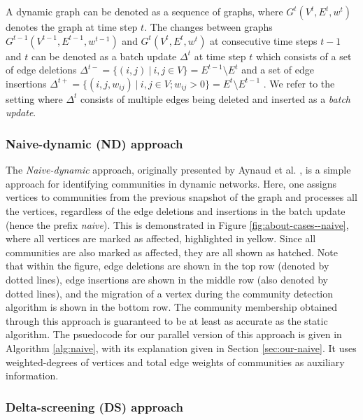 A dynamic graph can be denoted as a sequence of graphs, where $G^t(V^t, E^t, w^t)$ denotes the graph at time step $t$. The changes between graphs $G^{t-1}(V^{t-1}, E^{t-1}, w^{t-1})$ and $G^t(V^t, E^t, w^t)$ at consecutive time steps $t-1$ and $t$ can be denoted as a batch update $\Delta^t$ at time step $t$ which consists of a set of edge deletions $\Delta^{t-} = \{(i, j)\ |\ i, j \in V\} = E^{t-1} \setminus E^t$ and a set of edge insertions $\Delta^{t+} = \{(i, j, w_{ij})\ |\ i, j \in V; w_{ij} > 0\} = E^t \setminus E^{t-1}$ \cite{com-zarayeneh21}. We refer to the setting where $\Delta^t$ consists of multiple edges being deleted and inserted as a \textit{batch update}.


\subsubsection{Naive-dynamic (ND) approach}
\label{sec:naive-dynamic}

The \textit{Naive-dynamic} approach, originally presented by Aynaud et al. \cite{com-aynaud10}, is a simple approach for identifying communities in dynamic networks. Here, one assigns vertices to communities from the previous snapshot of the graph and processes all the vertices, regardless of the edge deletions and insertions in the batch update (hence the prefix \textit{naive}). This is demonstrated in Figure \ref{fig:about-cases--naive}, where all vertices are marked as affected, highlighted in yellow. Since all communities are also marked as affected, they are all shown as hatched. Note that within the figure, edge deletions are shown in the top row (denoted by dotted lines), edge insertions are shown in the middle row (also denoted by dotted lines), and the migration of a vertex during the community detection algorithm is shown in the bottom row. The community membership obtained through this approach is guaranteed to be at least as accurate as the static algorithm. The psuedocode for our parallel version of this approach is given in Algorithm \ref{alg:naive}, with its explanation given in Section \ref{sec:our-naive}. It uses weighted-degrees of vertices and total edge weights of communities as auxiliary information.


\subsubsection{Delta-screening (DS) approach}
\label{sec:delta-screening}

